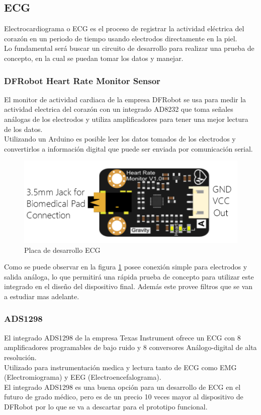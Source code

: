 \subsection{ECG}
Electrocardiograma o ECG es el proceso de registrar la actividad eléctrica del corazón en un periodo de tiempo usando electrodos directamente en la piel.\\
Lo fundamental será buscar un circuito de desarrollo para realizar una prueba de concepto, en la cual se puedan tomar los datos y manejar.
\subsubsection{DFRobot Heart Rate Monitor Sensor}
El monitor de actividad cardiaca de la empresa DFRobot se usa para medir la actividad electrica del corazón con un integrado AD8232\cite{ad8232} que toma señales análogas de los electrodos y utiliza amplificadores para tener una mejor lectura de los datos.\\
Utilizando un Arduino es posible leer los datos tomados de los electrodos y convertirlos a información digital que puede ser enviada por comunicación serial.\\

\begin{figure}[H]
	\centering
	\includegraphics[scale=0.5]{figuras/sensor/ecg/ecg.png}
	\caption{Placa de desarrollo ECG}
	\label{ecg}
\end{figure}

Como se puede observar en la figura \ref{ecg} posee conexión simple para electrodos y salida análoga, lo que permitirá una rápida prueba de concepto para utilizar este integrado en el diseño del dispositivo final. Además este provee filtros que se van a estudiar mas adelante.


\subsubsection{ADS1298}
El integrado ADS1298 de la empresa Texas Instrument ofrece un ECG con 8 amplificadores programables de bajo ruido y 8 conversores Análogo-digital de alta resolución.\\
Utilizado para instrumentación medica y lectura tanto de ECG como EMG (Electromiograma) y EEG (Electroencefalograma).\\
El integrado ADS1298 es una buena opción para un desarrollo de ECG en el futuro de grado médico, pero es de un precio 10 veces mayor al dispositivo de DFRobot por lo que se va a descartar para el prototipo funcional.
